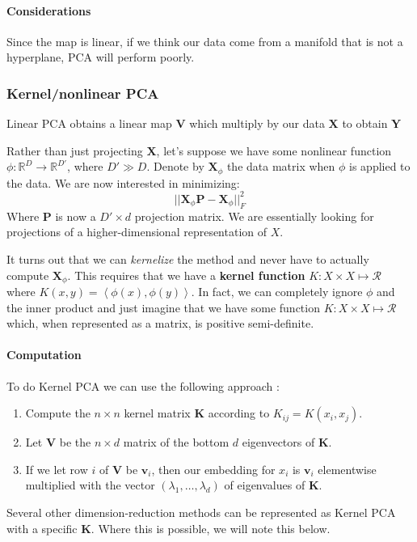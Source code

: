 \documentclass[12pt,a4paper]{article}
\newcommand{\abr}[1]{\left\langle #1 \right\rangle}
\newcommand{\1}[1]{\mathds{1}\left[#1\right]}
\newcommand{\R}{\mathbb{R}}
\newcommand{\B}[1]{\mathbf{#1}}
\newcommand{\C}[1]{\mathscr{#1}}
\begin{document}
\paragraph{Considerations} Since the map is linear, if we think our data come from a manifold that is not a hyperplane, PCA will perform poorly.

\subsubsection{Kernel/nonlinear PCA}
Linear PCA obtains a linear map $\B V$ which multiply by our data $\B X$ to obtain $\B Y$%

Rather than just projecting $\B X$, let's suppose we have some nonlinear function $\phi: \R^D \to \R^{D'}$, where $D'\gg D$. Denote by $\B X_\phi$ the data matrix when $\phi$ is applied to the data. We are now interested in minimizing:
\[||\B X_\phi\B P-\B X_\phi||_F^2\]
Where $\B P$ is now a $D'\times d$ projection matrix. We are essentially looking for projections of a higher-dimensional representation of $X$.

It turns out that we can \textit{kernelize} the method and never have to actually compute $\B X_\phi$. This requires that we have a \textbf{kernel function} $K:X\times X\mapsto \C R$ where $K(x,y)=\abr{\phi(x),\phi(y)}$. In fact, we can completely ignore $\phi$ and the inner product and just imagine that we have some function $K:X\times X\mapsto \C R$ which, when represented as a matrix, is positive semi-definite.

\paragraph{Computation} To do Kernel PCA we can use the following approach \cite{fml}:
\begin{enumerate}
    \item Compute the $n\times n$ kernel matrix $\B K$ according to $K_{ij}=K(x_i,x_j)$.
    \item Let $\B V$ be the $n\times d$ matrix of the bottom $d$ eigenvectors of $\B K$.
    \item If we let row $i$ of $\B V$ be $\B v_i$, then our embedding for $x_i$ is $\B v_i$ elementwise multiplied with the vector $(\lambda_1,\ldots,\lambda_d)$ of eigenvalues of $\B K$.
\end{enumerate}

Several other dimension-reduction methods can be represented as Kernel PCA with a specific $\B K$. Where this is possible, we will note this below.
\end{document}
